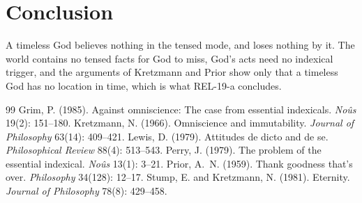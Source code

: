 \documentclass{situationist-preprint}
\begin{document}
\section{Conclusion}

A timeless God believes nothing in the tensed mode, and loses nothing by it. The world contains no tensed facts for God to miss, God's acts need no indexical trigger, and the arguments of Kretzmann and Prior show only that a timeless God has no location in time, which is what REL-19-a concludes.

\begin{thebibliography}{99}\small
{} Grim, P. (1985). Against omniscience: The case from essential indexicals. \emph{No\^us} 19(2): 151--180.
 Kretzmann, N. (1966). Omniscience and immutability. \emph{Journal of Philosophy} 63(14): 409--421.
 Lewis, D. (1979). Attitudes de dicto and de se. \emph{Philosophical Review} 88(4): 513--543.
 Perry, J. (1979). The problem of the essential indexical. \emph{No\^us} 13(1): 3--21.
 Prior, A.~N. (1959). Thank goodness that's over. \emph{Philosophy} 34(128): 12--17.
 Stump, E. and Kretzmann, N. (1981). Eternity. \emph{Journal of Philosophy} 78(8): 429--458.
\end{thebibliography}
\end{document}
